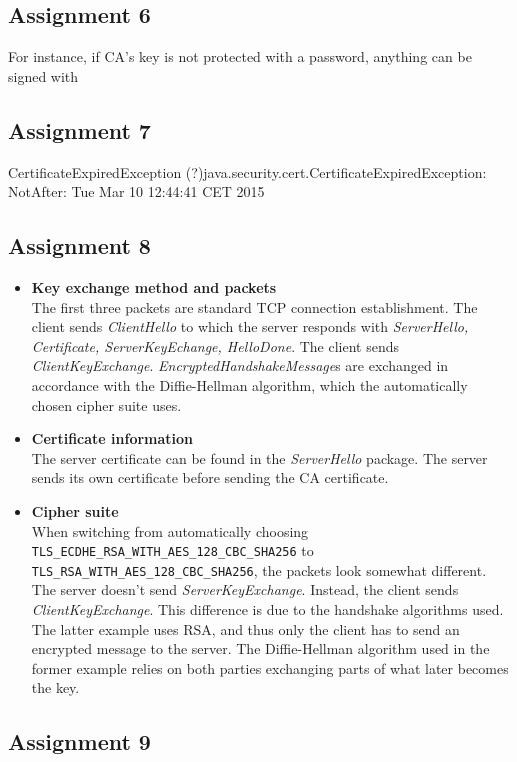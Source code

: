\documentclass[11pt,a4paper]{article}
\begin{document}
\subsection{Assignment 6}
For instance, if CA's key is not protected with a password, anything can be signed with
\subsection{Assignment 7}
CertificateExpiredException (?)java.security.cert.CertificateExpiredException: NotAfter: Tue Mar 10 12:44:41 CET 2015
\subsection{Assignment 8} 
\begin{itemize}
\item \textbf{Key exchange method and packets}\\The first three packets are standard TCP connection establishment. The client sends \textit{ClientHello} to which the server responds with \textit{ServerHello, Certificate, ServerKeyEchange, HelloDone}. The client sends \textit{ClientKeyExchange}. \textit{EncryptedHandshakeMessage}s are exchanged in accordance with the Diffie-Hellman algorithm, which the automatically chosen cipher suite uses.
\item \textbf{Certificate information}\\
The server certificate can be found in the \textit{ServerHello} package. The server sends its own certificate before sending the CA certificate.
\item \textbf{Cipher suite}\\
When switching from automatically choosing \texttt{TLS\_ECDHE\_RSA\_WITH\_AES\_128\_CBC\_SHA256} to
\texttt{TLS\_RSA\_WITH\_AES\_128\_CBC\_SHA256}, the packets look somewhat different. The server doesn't send \textit{ServerKeyExchange}. Instead, the client sends \textit{ClientKeyExchange}. This difference is due to the handshake algorithms used. The latter example uses RSA, and thus only the client has to send an encrypted message to the server. The Diffie-Hellman algorithm used in the former example relies on both parties exchanging parts of what later becomes the key.
\end{itemize}

\subsection{Assignment 9}
\end{document}
